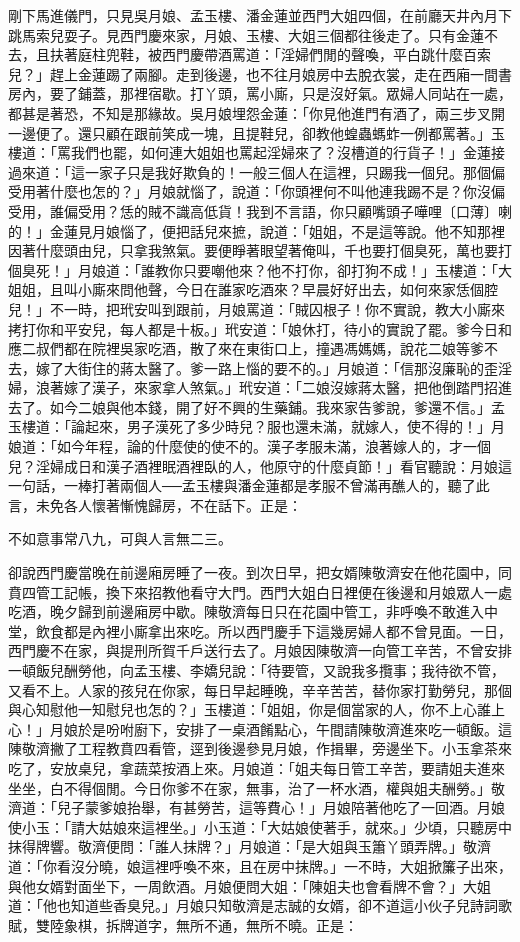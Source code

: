 剛下馬進儀門，只見吳月娘、孟玉樓、潘金蓮並西門大姐四個，在前廳天井內月下跳馬索兒耍子。見西門慶來家，月娘、玉樓、大姐三個都往後走了。只有金蓮不去，且扶著庭柱兜鞋，被西門慶帶酒罵道：「淫婦們閒的聲喚，平白跳什麼百索兒？」趕上金蓮踢了兩腳。走到後邊，也不往月娘房中去脫衣裳，走在西廂一間書房內，要了鋪蓋，那裡宿歇。打丫頭，罵小廝，只是沒好氣。眾婦人同站在一處，都甚是著恐，不知是那緣故。吳月娘埋怨金蓮：「你見他進門有酒了，兩三步叉開一邊便了。還只顧在跟前笑成一塊，且提鞋兒，卻教他蝗蟲螞蚱一例都罵著。」玉樓道：「罵我們也罷，如何連大姐姐也罵起淫婦來了？沒槽道的行貨子！」金蓮接過來道：「這一家子只是我好欺負的！一般三個人在這裡，只踢我一個兒。那個偏受用著什麼也怎的？」月娘就惱了，說道：「你頭裡何不叫他連我踢不是？你沒偏受用，誰偏受用？恁的賊不識高低貨！我到不言語，你只顧嘴頭子嘩哩〔口薄〕喇的！」金蓮見月娘惱了，便把話兒來摭，說道：「姐姐，不是這等說。他不知那裡因著什麼頭由兒，只拿我煞氣。要便睜著眼望著俺叫，千也要打個臭死，萬也要打個臭死！」月娘道：「誰教你只要嘲他來？他不打你，卻打狗不成！」玉樓道：「大姐姐，且叫小廝來問他聲，今日在誰家吃酒來？早晨好好出去，如何來家恁個腔兒！」不一時，把玳安叫到跟前，月娘罵道：「賊囚根子！你不實說，教大小廝來拷打你和平安兒，每人都是十板。」玳安道：「娘休打，待小的實說了罷。爹今日和應二叔們都在院裡吳家吃酒，散了來在東街口上，撞遇馮媽媽，說花二娘等爹不去，嫁了大街住的蔣太醫了。爹一路上惱的要不的。」月娘道：「信那沒廉恥的歪淫婦，浪著嫁了漢子，來家拿人煞氣。」玳安道：「二娘沒嫁蔣太醫，把他倒踏門招進去了。如今二娘與他本錢，開了好不興的生藥鋪。我來家告爹說，爹還不信。」孟玉樓道：「論起來，男子漢死了多少時兒？服也還未滿，就嫁人，使不得的！」月娘道：「如今年程，論的什麼使的使不的。漢子孝服未滿，浪著嫁人的，才一個兒？淫婦成日和漢子酒裡眠酒裡臥的人，他原守的什麼貞節！」看官聽說：月娘這一句話，一棒打著兩個人──孟玉樓與潘金蓮都是孝服不曾滿再醮人的，聽了此言，未免各人懷著慚愧歸房，不在話下。正是：

不如意事常八九，可與人言無二三。

卻說西門慶當晚在前邊廂房睡了一夜。到次日早，把女婿陳敬濟安在他花園中，同賁四管工記帳，換下來招教他看守大門。西門大姐白日裡便在後邊和月娘眾人一處吃酒，晚夕歸到前邊廂房中歇。陳敬濟每日只在花園中管工，非呼喚不敢進入中堂，飲食都是內裡小廝拿出來吃。所以西門慶手下這幾房婦人都不曾見面。一日，西門慶不在家，與提刑所賀千戶送行去了。月娘因陳敬濟一向管工辛苦，不曾安排一頓飯兒酬勞他，向孟玉樓、李嬌兒說：「待要管，又說我多攬事；我待欲不管，又看不上。人家的孩兒在你家，每日早起睡晚，辛辛苦苦，替你家打勤勞兒，那個與心知慰他一知慰兒也怎的？」玉樓道：「姐姐，你是個當家的人，你不上心誰上心！」月娘於是吩咐廚下，安排了一桌酒餚點心，午間請陳敬濟進來吃一頓飯。這陳敬濟撇了工程教賁四看管，逕到後邊參見月娘，作揖畢，旁邊坐下。小玉拿茶來吃了，安放桌兒，拿蔬菜按酒上來。月娘道：「姐夫每日管工辛苦，要請姐夫進來坐坐，白不得個閒。今日你爹不在家，無事，治了一杯水酒，權與姐夫酬勞。」敬濟道：「兒子蒙爹娘抬舉，有甚勞苦，這等費心！」月娘陪著他吃了一回酒。月娘使小玉：「請大姑娘來這裡坐。」小玉道：「大姑娘使著手，就來。」少頃，只聽房中抹得牌響。敬濟便問：「誰人抹牌？」月娘道：「是大姐與玉簫丫頭弄牌。」敬濟道：「你看沒分曉，娘這裡呼喚不來，且在房中抹牌。」一不時，大姐掀簾子出來，與他女婿對面坐下，一周飲酒。月娘便問大姐：「陳姐夫也會看牌不會？」大姐道：「他也知道些香臭兒。」月娘只知敬濟是志誠的女婿，卻不道這小伙子兒詩詞歌賦，雙陸象棋，拆牌道字，無所不通，無所不曉。正是：

